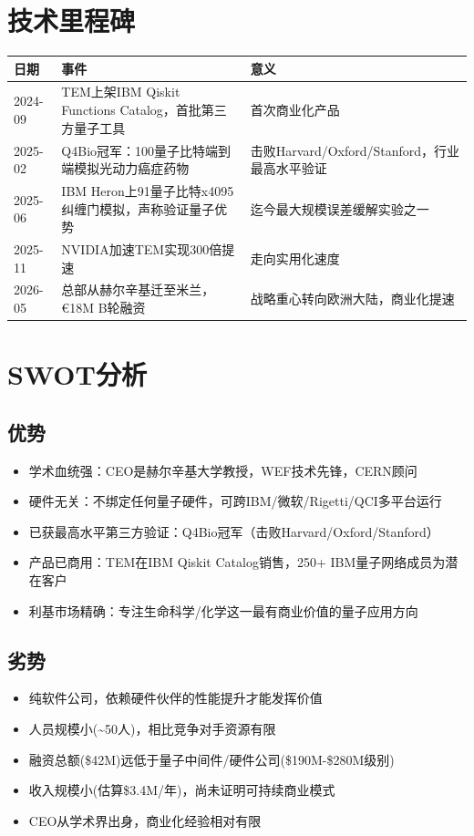 \documentclass[11pt,a4paper]{ctexart}
\begin{document}
\section{技术里程碑}
{\footnotesize\begin{longtable}{p{1.8cm}p{7cm}p{5cm}}
\toprule\textbf{日期} & \textbf{事件} & \textbf{意义} \\ \midrule\endfirsthead
2024-09 & TEM上架IBM Qiskit Functions Catalog，首批第三方量子工具 & 首次商业化产品 \\
2025-02 & Q4Bio冠军：100量子比特端到端模拟光动力癌症药物 & 击败Harvard/Oxford/Stanford，行业最高水平验证 \\
2025-06 & IBM Heron上91量子比特x4095纠缠门模拟，声称验证量子优势 & 迄今最大规模误差缓解实验之一 \\
2025-11 & NVIDIA加速TEM实现300倍提速 & 走向实用化速度 \\
2026-05 & 总部从赫尔辛基迁至米兰，€18M B轮融资 & 战略重心转向欧洲大陆，商业化提速 \\
\bottomrule\end{longtable}}
\section{SWOT分析}
\subsection{优势}
\begin{itemize}[leftmargin=1.5em]
\item 学术血统强：CEO是赫尔辛基大学教授，WEF技术先锋，CERN顾问
\item 硬件无关：不绑定任何量子硬件，可跨IBM/微软/Rigetti/QCI多平台运行
\item 已获最高水平第三方验证：Q4Bio冠军（击败Harvard/Oxford/Stanford）
\item 产品已商用：TEM在IBM Qiskit Catalog销售，250+ IBM量子网络成员为潜在客户
\item 利基市场精确：专注生命科学/化学这一最有商业价值的量子应用方向
\end{itemize}
\subsection{劣势}
\begin{itemize}[leftmargin=1.5em]
\item 纯软件公司，依赖硬件伙伴的性能提升才能发挥价值
\item 人员规模小(\textasciitilde{}50人)，相比竞争对手资源有限
\item 融资总额(\$42M)远低于量子中间件/硬件公司(\$190M-\$280M级别)
\item 收入规模小(估算\$3.4M/年)，尚未证明可持续商业模式
\item CEO从学术界出身，商业化经验相对有限
\end{itemize}
\end{document}
